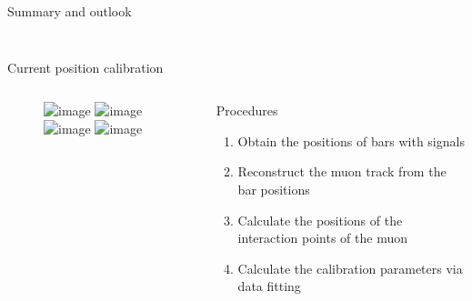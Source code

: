 \documentclass{ikpKoeln}
\begin{document}
\begin{frame}[t]{Summary and outlook}
\begin{columns}[c]
\begin{column}{0.45 \textwidth}
\begin{figure}
			\end{figure}
		\end{column}
	\end{columns}
\end{frame}

\begin{frame}[t]{Current position calibration}
	\vspace*{-2em}
	\begin{columns}[t]
		\begin{column}{0.45 \textwidth}
			\begin{figure}[t]
				\includegraphics<1>[width = \textwidth]{R3BCon2024GSI/side_view1.png}
				\includegraphics<2>[width = \textwidth]{R3BCon2024GSI/side_view2.png}
				\includegraphics<3-4>[width = \textwidth]{R3BCon2024GSI/side_view3.png}
				\includegraphics<5>[width = \textwidth]{R3BCon2024GSI/side_view4.png}
			\end{figure}
		\end{column}
		\begin{column}{0.45 \textwidth}
			\begin{exampleblock}{Procedures}
				\begin{enumerate}
					\setlength\itemsep{0em}
					\item<1-> Obtain the positions of bars with signals
					\item<2-> Reconstruct the muon track from the bar positions
					\item<3-> Calculate the positions of the interaction points of the muon
					\item<4-> Calculate the calibration parameters via data fitting
				\end{enumerate}
			\end{exampleblock}
		\end{column}
	\end{columns}
\end{frame}
\end{document}
